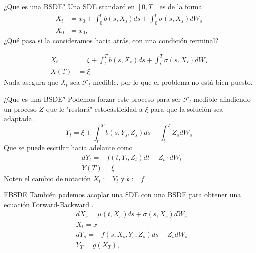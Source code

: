 \documentclass[aspectratio=169,xcolor=dvipsnames]{beamer}
\begin{document}
\begin{frame}{¿Que es una BSDE?}
	Una SDE standard en $[0,T]$ es de la forma
	\begin{equation}
		\label{eqn:SDE}
		\begin{split}
			X_t&=x_0+\int_0^t b\left(s, X_s\right) d s+\int_0^t \sigma\left(s, X_s\right) d W_s\\
			X_0&=x_0,
		\end{split}
	\end{equation}
¿Qué pasa si la consideramos hacia atrás, con una condición terminal? 

\begin{equation}
	\begin{split}
	X_t&=\xi+\int_t^T b\left(s, X_s\right) d s+\int_t^T \sigma\left(s, X_s\right) d W_s\\
	X(T)&=\xi
\end{split}
\end{equation}
Nada asegura que $X_t$ sea $\mathcal{F}_t$-medible, por lo que el problema no está bien puesto.
\end{frame}
\begin{frame}{¿Que es una BSDE?}
	Podemos forzar este proceso para ser $\mathcal{F}_t$-medible añadiendo un proceso $Z$ que le "restará" estocásticidad a $\xi$ para que la solución sea adaptada.   
	\begin{equation}
		Y_t=\xi+\int_t^T b\left(s, Y_s, Z_s\right) d s-\int_t^T Z_s d W_s
	\end{equation}
Que se puede escribir hacia adelante como 
\begin{equation}
\label{eqn:BSDE}
\begin{split}
	&dY_t=-f(t,Y_t,Z_t)dt+Z_t\cdot dW_t\\
	&Y(T)=\xi
\end{split}
\end{equation}
Noten el cambio de notación $X_t:=Y_t$ y $b:=f$
\end{frame}

\begin{frame}{FBSDE}
	También podemos acoplar una SDE con una BSDE para obtener una ecuación Forward-Backward .
	\begin{equation}
		\label{eqn:FBSDE}
		\begin{split}
			&dX_s=\mu(t,X_s)ds+\sigma(s,X_s)dW_s\\
			&X_t=x\\
			&dY_s=-f(s,X_s,Y_s,Z_s)ds+Z_s dW_s\\
			&Y_T=g(X_T),
		\end{split}
	\end{equation}
\end{frame}
\end{document}
